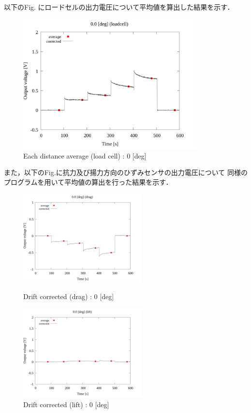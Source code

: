 以下のFig. にロードセルの出力電圧について平均値を算出した結果を示す．

\begin{figure}[htbp]
	\footnotesize
	\begin{center}
		\includegraphics[width=95mm]{../../02_workspace/result/2-1/plot/03-1_loadcell/03_loadcell_average_0.png}
		\caption{Each distance average (load cell) : 0 [deg]}
	\end{center}
\end{figure}

また，以下のFig.に抗力及び揚力方向のひずみセンサの出力電圧について
同様のプログラムを用いて平均値の算出を行った結果を示す．

\begin{figure}[htbp]
	\begin{minipage}[b]{0.45\linewidth}
		\centering
		\includegraphics[width=65mm]{../../02_workspace/result/2-1/plot/03-2_drag/03_drag_average_0.png}
		\caption{Drift corrected (drag) : 0 [deg]}
	\end{minipage}
	\begin{minipage}[b]{0.45\linewidth}
		\centering
		\includegraphics[width=65mm]{../../02_workspace/result/2-1/plot/03-3_lift/03_lift_average_0.png}
		\caption{Drift corrected (lift) : 0 [deg]}
	\end{minipage}
\end{figure}

